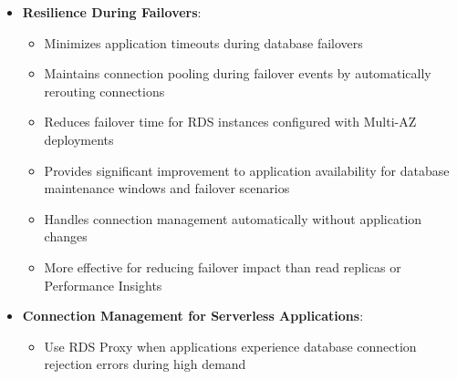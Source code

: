 \documentclass[11pt,a4paper]{report}
\begin{document}
\begin{itemize}
\begin{itemize}
  \item Makes applications more resilient to database failures by automatically connecting to the standby DB instance
  \item Can enforce IAM authentication for databases and securely store credentials in AWS Secrets Manager
  \item Handles unpredictable surges in database traffic and prevents oversubscription
  \item Queues or throttles application connections that can't be served immediately, helping applications scale without overwhelming databases
  \item Confirmed the importance of RDS Proxy in reducing failover times and managing connection pools
  \item Particularly effective for serverless applications using Lambda that may create many database connections
  \item Acts as an intermediary layer that sits between applications and databases to manage connection pools
  \item Significantly reduces timeouts during sudden traffic surges by efficiently managing database connections
  \item Addresses issues of high CPU and memory utilization caused by large numbers of open connections
\end{itemize}
  \item \textbf{Resilience During Failovers}:
\begin{itemize}
  \item Minimizes application timeouts during database failovers
  \item Maintains connection pooling during failover events by automatically rerouting connections
  \item Reduces failover time for RDS instances configured with Multi-AZ deployments
  \item Provides significant improvement to application availability for database maintenance windows and failover scenarios
  \item Handles connection management automatically without application changes
  \item More effective for reducing failover impact than read replicas or Performance Insights
\end{itemize}
  \item \textbf{Connection Management for Serverless Applications}:
\begin{itemize}
  \item Use RDS Proxy when applications experience database connection rejection errors during high demand

\end{itemize}
\end{itemize}
\end{document}

